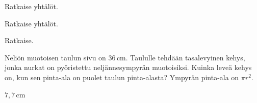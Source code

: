 \begin{tehtavasivu}
\begin{tehtava}
    Ratkaise yhtälöt.
    \begin{alakohdat}
    \end{alakohdat}
    \begin{vastaus}
        \begin{alakohdat}
        \end{alakohdat}
    \end{vastaus}
\end{tehtava}

\begin{tehtava}
    Ratkaise yhtälöt.
    \begin{alakohdat}
    \end{alakohdat}
    \begin{vastaus}
        \begin{alakohdat}
        \end{alakohdat}
    \end{vastaus}
\end{tehtava}

\begin{tehtava}
    Ratkaise.
    \begin{alakohdat}
	\end{alakohdat}
    \begin{vastaus}
        \begin{alakohdat}
        \end{alakohdat}
    \end{vastaus}
\end{tehtava}

\begin{tehtava} %
Neliön muotoisen taulun sivu on $36$\,cm. Taululle tehdään tasalevyinen kehys, jonka nurkat on pyöristettu neljännesympyrän muotoisiksi. Kuinka leveä kehys on, kun sen pinta-ala on puolet taulun pinta-alasta? Ympyrän pinta-ala on $\pi r^2$.
    \begin{vastaus}
     $7,7$\,cm
    \end{vastaus}
\end{tehtava}


\end{tehtavasivu}
